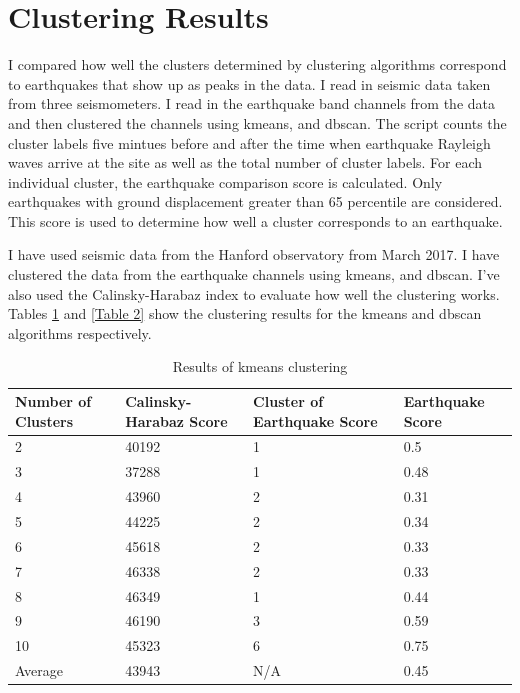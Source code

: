 \documentclass[colorlinks=true,pdfstartview=FitV,linkcolor=blue,
            citecolor=red,urlcolor=magenta]{ligodoc}
\begin{document}
\section{Clustering Results}

\indent

\par I compared how well the clusters determined by clustering algorithms correspond to earthquakes that show up as peaks in the data. I read in seismic data taken from three seismometers. I read in the earthquake band channels from the data and then clustered the channels using kmeans, and dbscan. The script counts the cluster labels five mintues before and after the time when earthquake Rayleigh waves arrive at the site as well as the total number of cluster labels. For each individual cluster, the earthquake comparison score is calculated. Only earthquakes with ground displacement greater than 65 percentile are considered. This score is used to determine how well a cluster corresponds to an earthquake. 

\par I have used seismic data from the Hanford observatory from March 2017. I have clustered the data from the earthquake channels using kmeans, and  dbscan. I've also used the Calinsky-Harabaz index to evaluate how well the clustering works. Tables \ref{Table 1} and \ref{Table 2} show the clustering results for the kmeans and dbscan algorithms respectively.

\begin{table}[h!]
\centering
 \begin{tabular}{| m{3.5cm} m{3.5cm} m{3.5cm} m{3.5cm}|} 
 \hline
 Number of Clusters & Calinsky-Harabaz Score & Cluster of Earthquake Score & Earthquake Score\\ [0.5ex] 
 \hline\hline
 2 & 40192 & 1 & 0.5\\ 
 \hline
 3 & 37288 & 1 & 0.48\\
 \hline
 4 & 43960 & 2 & 0.31\\
 \hline
 5 & 44225 & 2 & 0.34\\
 \hline
 6 & 45618 & 2 & 0.33\\ 
 \hline
 7 & 46338 & 2 & 0.33\\
 \hline
 8 & 46349 & 1 & 0.44\\
 \hline
 9 & 46190 & 3 & 0.59\\
 \hline
 10 & 45323 & 6 & 0.75\\
 \hline
 Average & 43943 & N/A & 0.45\\
 \hline
 \end{tabular}
 \caption{Results of kmeans clustering}
 \label{Table 1}
\end{table}
\end{document}
